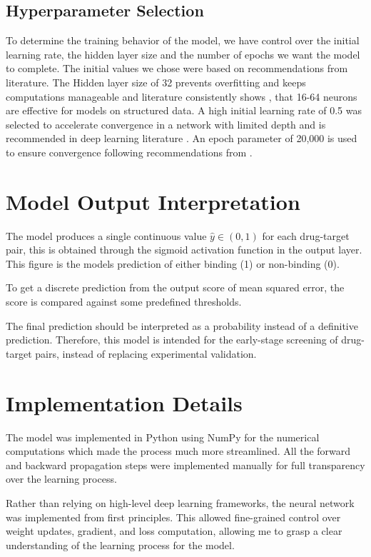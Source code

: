 \subsection{Hyperparameter Selection}
To determine the training behavior of the model, we have control over the initial learning rate, the hidden layer size and the number of epochs we want the model to complete. The initial values we chose were based on recommendations from literature. The Hidden layer size of 32 prevents overfitting and keeps computations manageable and literature consistently shows \citep{heaton2017neural}, that 16-64 neurons are effective for models on structured data. A high initial learning rate of 0.5 was selected to accelerate convergence in a network with limited depth and is recommended in deep learning literature \citep{goodfellow2016deep}. An epoch parameter of 20,000 is used to ensure convergence following recommendations from \citep{bishop2006prml}.


\section{Model Output Interpretation}
The model produces a single continuous value $\hat{y} \in (0,1)$ for each drug-target pair, this is obtained through the sigmoid activation function in the output layer. This figure is the models prediction of either binding (1) or non-binding (0). 

To get a discrete prediction from the output score of mean squared error, the score is compared against some predefined thresholds. 

The final prediction should be interpreted as a probability instead of a definitive prediction. Therefore, this model is intended for the early-stage screening of drug-target pairs, instead of replacing experimental validation.

\section{Implementation Details}
The model was implemented in Python using NumPy for the numerical computations which made the process much more streamlined. All the forward and backward propagation steps were implemented manually for full transparency over the learning process.

Rather than relying on high-level deep learning frameworks, the neural network was implemented from first principles. This allowed fine-grained control over weight updates, gradient, and loss computation, allowing me to grasp a clear understanding of the learning process for the model.


